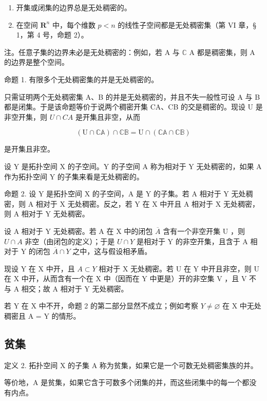\begin{enumerate}
\def\labelenumi{\arabic{enumi})}
\setcounter{enumi}{1}
\item
开集或闭集的边界总是无处稠密的。
\item
在空间 \(\mathbf{R}^n\) 中，每个维数 \(p < n\) 的线性子空间都是无处稠密集（第 VI 章，§ 1，第 4 号，命题 2）。
\end{enumerate}

注。任意子集的边界未必是无处稠密的：例如，若 A 与 \(\mathbb{C}\) A 都是稠密集，则 A 的边界是整个空间。

命题 1. 有限多个无处稠密集的并是无处稠密的。

只需证明两个无处稠密集 A、B 的并是无处稠密的，并且不失一般性可设 A 与 B 都是闭集。于是该命题等价于说两个稠密开集 CA、CB 的交是稠密的。现设 U 是非空开集，则 \(U \cap CA\) 是开集且非空，从而

\[
\left(\mathrm{U} \cap \mathbb {C A}\right) \cap \mathbb {C B} = \mathrm{U} \cap \left(\mathbb {C A} \cap \mathbb {C B}\right)
\]

是开集且非空。

设 Y 是拓扑空间 X 的子空间。Y 的子空间 A 称为相对于 Y 无处稠密的，如果 A 作为拓扑空间 Y 的子集来看是无处稠密的。

命题 2. 设 Y 是拓扑空间 X 的子空间，A 是 Y 的子集。若 A 相对于 Y 无处稠密，则 A 相对于 X 无处稠密。反之，若 Y 在 X 中开且 A 相对于 X 无处稠密，则 A 相对于 Y 无处稠密。

设 A 相对于 Y 无处稠密。若 A 在 X 中的闭包 \(\overline{A}\) 含有一个非空开集 U ，则 \(U \cap A\) 非空（由闭包的定义）；于是 \(U \cap Y\) 是相对于 Y 的非空开集，且含于 A 相对于 Y 的闭包 \(\overline{A} \cap Y\) 之中，这与假设相矛盾。

现设 Y 在 X 中开，且 \(A \subset Y\) 相对于 X 无处稠密。若 U 在 Y 中开且非空，则 U 在 X 中开，从而含有一个在 X 中（因而在 Y 中更是）开的非空集 V ，且 V 不与 A 相交；故 A 相对于 Y 无处稠密。

若 Y 在 X 中不开，命题 2 的第二部分显然不成立；例如考察 \(Y \neq \varnothing\) 在 X 中无处稠密且 A = Y 的情形。

\subsection{贫集}

定义 2. 拓扑空间 X 的子集 A 称为贫集，如果它是一个可数无处稠密集族的并。

等价地，A 是贫集，如果它含于可数多个闭集的并，而这些闭集中的每一个都没有内点。

